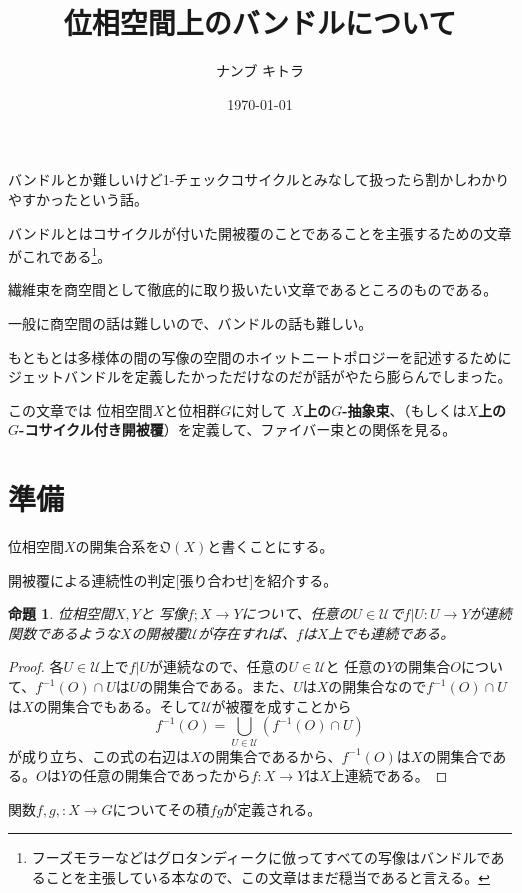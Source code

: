 \documentclass[leqno]{jsarticle}
\title{位相空間上のバンドルについて}
\author{ナンブ キトラ}
\date{\today}
\newtheorem{prop}[thm]{命題}
\begin{document}
\maketitle
バンドルとか難しいけど1-チェックコサイクルとみなして扱ったら割かしわかりやすかったという話。

バンドルとはコサイクルが付いた開被覆のことであることを主張するための文章がこれである\footnote{フーズモラーなどはグロタンディークに倣ってすべての写像はバンドルであることを主張している本なので、この文章はまだ穏当であると言える。}。

繊維束を商空間として徹底的に取り扱いたい文章であるところのものである。

一般に商空間の話は難しいので、バンドルの話も難しい。

もともとは多様体の間の写像の空間のホイットニートポロジーを記述するためにジェットバンドルを定義したかっただけなのだが話がやたら膨らんでしまった。

この文章では
位相空間$X$と位相群$G$に対して
\textbf{$X$上の$G$-抽象束}、（もしくは\textbf{$X$上の$G$-コサイクル付き開被覆}）を定義して、ファイバー束との関係を見る。

\section{準備}

位相空間$X$の開集合系を$\mathfrak{O}(X)$と書くことにする。

開被覆による連続性の判定[張り合わせ]を紹介する。
\begin{prop}位相空間$X,Y$と
写像$f;X\to Y$について、任意の$U\in \mathcal{U}$で$f|U:U\to Y$が連続関数であるような$X$の開被覆$\mathcal{U}$が存在すれば、$f$は$X$上でも連続である。
\end{prop}
\begin{proof}
各$U\in \mathcal{U}$上で$f|U$が連続なので、任意の$U\in \mathcal{U}$と
任意の$Y$の開集合$O$について、$f^{-1}(O)\cap U$は$U$の開集合である。また、$U$は$X$の開集合なので$f^{-1}(O)\cap U$は$X$の開集合でもある。そして$\mathcal{U}$が被覆を成すことから
\[
f^{-1}(O)=\bigcup_{U\in \mathcal{U}}(f^{-1}(O)\cap U)
\]
が成り立ち、この式の右辺は$X$の開集合であるから、$f^{-1}(O)$は$X$の開集合である。$O$は$Y$の任意の開集合であったから$f:X\to Y$は$X$上連続である。
\end{proof}

関数$f,g,:X\to G$についてその積$fg$が定義される。
\end{document}

